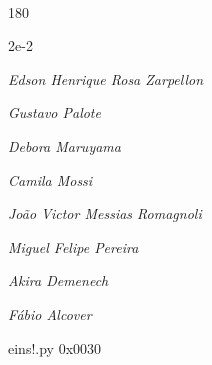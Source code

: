 \documentclass[12pt]{article}
\begin{document}

\pagebreak			

	\ 
	\vfill
	\begin{turn}{180}	
		\begin{minipage}{\textwidth}
		  	\ttfamily %
			\centering
			{\Huge 2e-2}
		  
			\hfill
		  
			

\textit{\small Edson Henrique Rosa Zarpellon}

\textit{\small Gustavo Palote}

\textit{\small Debora Maruyama}

\textit{\small Camila Mossi}

\textit{\small João Victor Messias Romagnoli}

\textit{\small Miguel Felipe Pereira}

\textit{\small Akira Demenech}

\textit{\small Fábio Alcover}

\bigskip

eins!.py
0x0030


		\end{minipage}	
	\end{turn}
	\vfill
	\

\pagebreak
\end{document}
